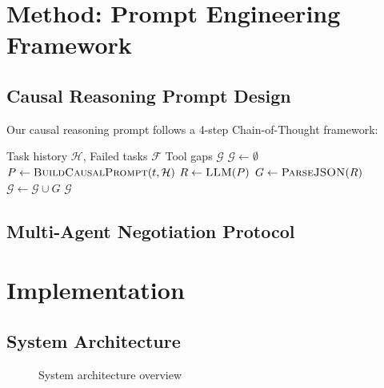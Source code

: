 \documentclass[11pt]{article}
\begin{document}
\section{Method: Prompt Engineering Framework}\label{sec:method}

\subsection{Causal Reasoning Prompt Design}

Our causal reasoning prompt follows a 4-step Chain-of-Thought framework:

\begin{algorithm}[t]
\caption{Causal Reasoning for Gap Detection}
\label{alg:causal}
\begin{algorithmic}[1]
\Require Task history $\mathcal{H}$, Failed tasks $\mathcal{F}$
\Ensure Tool gaps $\mathcal{G}$
\State $\mathcal{G} \gets \emptyset$
    \State $P \gets \textsc{BuildCausalPrompt}(t, \mathcal{H})$ \label{line:prompt}
    \State $R \gets \textsc{LLM}(P)$ 
    \State $G \gets \textsc{ParseJSON}(R)$ 
    \State $\mathcal{G} \gets \mathcal{G} \cup G$
\EndFor
\State \Return $\mathcal{G}$
\end{algorithmic}
\end{algorithm}

\subsection{Multi-Agent Negotiation Protocol}

\section{Implementation}\label{sec:implementation}

\subsection{System Architecture}

\begin{figure}[t]
\centering
{}
\caption{System architecture overview}
\label{fig:architecture}
\end{figure}
\end{document}
